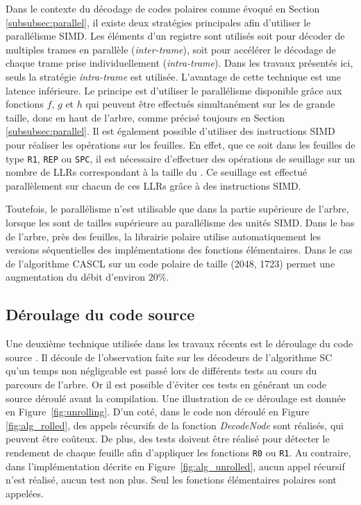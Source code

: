 Dans le contexte du décodage de codes polaires comme évoqué en Section \ref{subsubsec:parallel}, il existe deux stratégies principales afin d'utiliser le parallélisme SIMD. Les éléments d'un registre sont utilisés soit pour décoder de multiples trames en parallèle (\textit{inter-trame}), soit pour accélérer le décodage de chaque trame prise individuellement (\textit{intra-trame}). Dans les travaux présentés ici, seuls la stratégie \textit{intra-trame} est utilisée. L'avantage de cette technique est une latence inférieure. Le principe est d'utiliser le parallélisme disponible grâce aux fonctions $f$, $g$ et $h$ qui peuvent être effectués simultanément sur les \noeuds de grande taille, donc en haut de l'arbre, comme précisé toujours en Section \ref{subsubsec:parallel}. Il est également possible d'utiliser des instructions SIMD pour réaliser les opérations sur les feuilles. En effet, que ce soit dans les feuilles de type \texttt{R1}, \texttt{REP} ou \texttt{SPC}, il est nécessaire d'effectuer des opérations de seuillage sur un nombre de LLRs correspondant à la taille du \noeud. Ce seuillage est effectué parallèlement sur chacun de ces LLRs grâce à des instructions SIMD.

Toutefois, le parallélisme n'est utilisable que dans la partie supérieure de l'arbre, lorsque les \noeuds sont de tailles supérieure au parallélisme des unités SIMD. Dans le bas de l'arbre, près des feuilles, la librairie polaire \cite{cassagne_efficient_2015} utilise automatiquement les versions séquentielles des implémentations des fonctions élémentaires. Dans le cas de l'algorithme CASCL sur un code polaire de taille (2048, 1723) permet une augmentation du débit d'environ 20\%.


\subsection{Déroulage du code source}
\label{subsec:unroll}
Une deuxième technique utilisée dans les travaux récents est le déroulage du code source \cite{sarkis_autogenerating_2014,giard_fast_2014,cassagne_efficient_2015,cassagne_energy_2016}. Il découle de l'observation faite sur les décodeurs de l'algorithme SC qu'un temps non négligeable est passé lors de différents tests au cours du parcours de l'arbre. Or il est possible d'éviter ces tests en générant un code source déroulé avant la compilation. Une illustration de ce déroulage est donnée en Figure~\ref{fig:unrolling}. D'un coté, dans le code non déroulé en Figure \ref{fig:alg_rolled}, des appels récursifs de la fonction \textit{DecodeNode} sont réalisés, qui peuvent être coûteux. De plus, des tests doivent être réalisé pour détecter le rendement de chaque feuille afin d'appliquer les fonctions \texttt{R0} ou \texttt{R1}. Au contraire, dans l'implémentation décrite en Figure~\ref{fig:alg_unrolled}, aucun appel récursif n'est réalisé, aucun test non plus. Seul les fonctions élémentaires polaires sont appelées.

